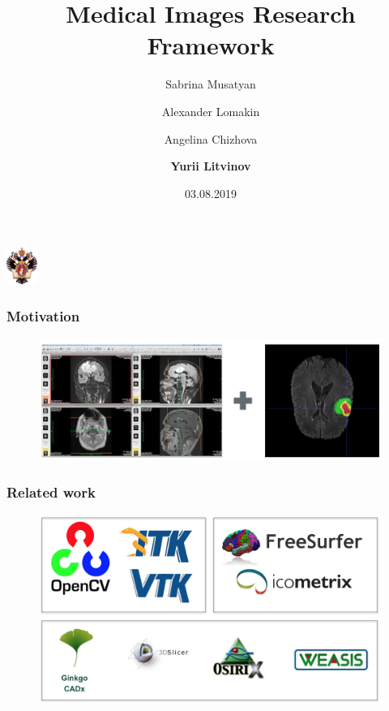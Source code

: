 \documentclass[xetex,mathserif,serif]{beamer}
\title[MIRF]{Medical Images Research Framework}
\institute[SPbSU]{Saint-Petersburg State University \\
	Software Engineering chair}
\author[Yurii Litvinov]{Sabrina Musatyan \\
	\and
	Alexander Lomakin \\
	\and
	Angelina Chizhova \\
	\and
	{\bfseries Yurii Litvinov}
	}
\date{03.08.2019}
\begin{document}
 

\begin{frame}
	\begin{center} 
		{\includegraphics[width=1cm]{pictures/SPbGU_Logo.png}} 
	\end{center}
	\titlepage
\end{frame}


\begin{frame}
     \frametitle{Motivation}
        \begin{figure}[b]
             \centering
             \includegraphics[width=12cm]{pictures/brainseg.png}
         \end{figure}
\end{frame}

\begin{frame}
    \frametitle{Related work}
    \begin{figure}[b]
        \centering
        \includegraphics[width=12cm]{pictures/overview.png}
    \end{figure}
\end{frame}
  
\end{document}
